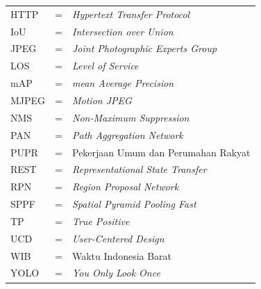\begin{tabular}{llp{3in}}
	HTTP	&  \hspace{1.5cm} = & \textit{Hypertext Transfer Protocol} \\
	IoU	&  \hspace{1.5cm} = & \textit{Intersection over Union} \\
	JPEG	&  \hspace{1.5cm} = & \textit{Joint Photographic Experts Group} \\
	LOS	&  \hspace{1.5cm} = & \textit{Level of Service} \\
	mAP	&  \hspace{1.5cm} = & \textit{mean Average Precision} \\
	MJPEG	&  \hspace{1.5cm} = & \textit{Motion JPEG} \\
	NMS	&  \hspace{1.5cm} = & \textit{Non-Maximum Suppression} \\
	PAN	&  \hspace{1.5cm} = & \textit{Path Aggregation Network} \\
	PUPR	&  \hspace{1.5cm} = & Pekerjaan Umum dan Perumahan Rakyat \\
	REST	&  \hspace{1.5cm} = & \textit{Representational State Transfer} \\
	RPN	&  \hspace{1.5cm} = & \textit{Region Proposal Network} \\
	SPPF	&  \hspace{1.5cm} = & \textit{Spatial Pyramid Pooling Fast} \\
	TP	&  \hspace{1.5cm} = & \textit{True Positive} \\
	UCD	&  \hspace{1.5cm} = & \textit{User-Centered Design} \\
	WIB	&  \hspace{1.5cm} = & Waktu Indonesia Barat \\
	YOLO	&  \hspace{1.5cm} = & \textit{You Only Look Once} \\
\end{tabular}